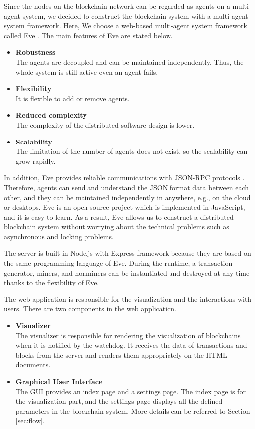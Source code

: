 Since the nodes on the blockchain network can be regarded as agents on a multi-agent system, we decided to construct the blockchain system with a multi-agent system framework. Here, We choose a web-based multi-agent system framework called Eve \cite{eve}. The main features of Eve are stated below.

\begin{itemize}
    \item \textbf{Robustness} \\
        The agents are decoupled and can be maintained independently. Thus, the whole system is still active even an agent fails.
    \item \textbf{Flexibility} \\
        It is flexible to add or remove agents.
    \item \textbf{Reduced complexity} \\
        The complexity of the distributed software design is lower.
    \item \textbf{Scalability} \\
        The limitation of the number of agents does not exist, so the scalability can grow rapidly.
\end{itemize}

In addition, Eve provides reliable communications with JSON-RPC protocols \cite{jsonrpc}. Therefore, agents can send and understand the JSON format data between each other, and they can be maintained independently in anywhere, e.g., on the cloud or desktops. Eve is an open source project which is implemented in JavaScript, and it is easy to learn. As a result, Eve allows us to construct a distributed blockchain system without worrying about the technical problems such as asynchronous and locking problems.

The server is built in Node.js with Express framework because they are based on the same programming language of Eve. During the runtime, a transaction generator, miners, and nonminers can be instantiated and destroyed at any time thanks to the flexibility of Eve.

The web application is responsible for the visualization and the interactions with users. There are two components in the web application.

\begin{itemize}
    \item \textbf{Visualizer} \\
        The visualizer is responsible for rendering the visualization of blockchains when it is notified by the watchdog. It receives the data of transactions and blocks from the server and renders them appropriately on the HTML documents.
    \item \textbf{Graphical User Interface} \\
        The GUI provides an index page and a settings page. The index page is for the visualization part, and the settings page displays all the defined parameters in the blockchain system. More details can be referred to Section \ref{sec:flow}.
\end{itemize}

